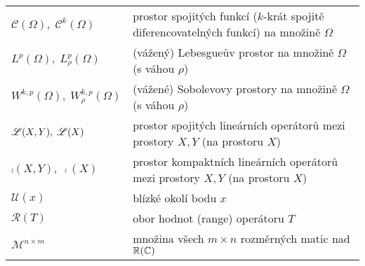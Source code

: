 
\begin{table}[h!]
\begin{tabular}{l|l}
$\mathcal{C}(\Omega), \; \mathcal{C}^k(\Omega)$
& prostor spojitých funkcí ($k$-krát spojitě diferencovatelných funkcí) na množině $\Omega$
\\
$L^p(\Omega), \; L^p_\rho(\Omega)$
& (vážený) Lebesgueův prostor na množině $\Omega$ (s váhou $\rho$)
\\
$W^{k,p}(\Omega), \; W^{k,p}_\rho(\Omega)$
& (vážené) Sobolevovy prostory na množině $\Omega$ (s váhou $\rho$)
\\
$\mathscr{L}(X, Y), \; \mathscr{L}(X)$
& prostor spojitých lineárních operátorů mezi prostory $X, Y$ (na prostoru $X$)
\\
$\comp(X, Y), \; \comp(X)$
& prostor kompaktních lineárních operátorů mezi prostory $X, Y$ (na prostoru $X$)\\
$\mathcal{U}(x)$ & blízké okolí bodu $x$\\
$\mathcal{R}(T)$ & obor hodnot (range) operátoru $T$\\
$\mathcal{M}^{n\times m}$ & množina všech $m\times n$ rozměrných matic nad $\mathbb{R}(\mathbb{C})$
\end{tabular}
\end{table}